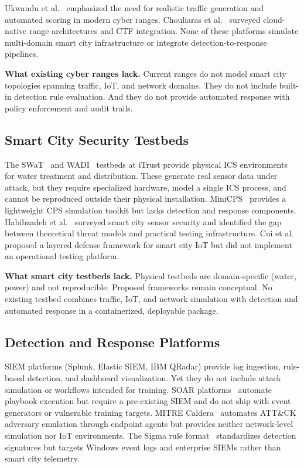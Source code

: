 \documentclass[conference,10pt]{IEEEtran}
\begin{document}
Ukwandu et al.~\cite{ukwandu2020review} emphasized the need for realistic traffic generation and automated scoring in modern cyber ranges. Chouliaras et al.~\cite{chouliaras2021cyber} surveyed cloud-native range architectures and CTF integration. None of these platforms simulate multi-domain smart city infrastructure or integrate detection-to-response pipelines.

\textbf{What existing cyber ranges lack.} Current ranges do not model smart city topologies spanning traffic, IoT, and network domains. They do not include built-in detection rule evaluation. And they do not provide automated response with policy enforcement and audit trails.

\subsection{Smart City Security Testbeds}

The SWaT~\cite{swat2016} and WADI~\cite{wadi2017} testbeds at iTrust provide physical ICS environments for water treatment and distribution. These generate real sensor data under attack, but they require specialized hardware, model a single ICS process, and cannot be reproduced outside their physical installation. MiniCPS~\cite{antonioli2017minicps} provides a lightweight CPS simulation toolkit but lacks detection and response components. Habibzadeh et al.~\cite{habibzadeh2019survey} surveyed smart city sensor security and identified the gap between theoretical threat models and practical testing infrastructure. Cui et al.~\cite{cui2018security} proposed a layered defense framework for smart city IoT but did not implement an operational testing platform.

\textbf{What smart city testbeds lack.} Physical testbeds are domain-specific (water, power) and not reproducible. Proposed frameworks remain conceptual. No existing testbed combines traffic, IoT, and network simulation with detection and automated response in a containerized, deployable package.

\subsection{Detection and Response Platforms}

SIEM platforms (Splunk, Elastic SIEM, IBM QRadar) provide log ingestion, rule-based detection, and dashboard visualization. Yet they do not include attack simulation or workflows intended for training. SOAR platforms~\cite{islam2019soar} automate playbook execution but require a pre-existing SIEM and do not ship with event generators or vulnerable training targets. MITRE Caldera~\cite{caldera2016} automates ATT\&CK adversary emulation through endpoint agents but provides neither network-level simulation nor IoT environments. The Sigma rule format~\cite{sigma2020} standardizes detection signatures but targets Windows event logs and enterprise SIEMs rather than smart city telemetry.
\end{document}
